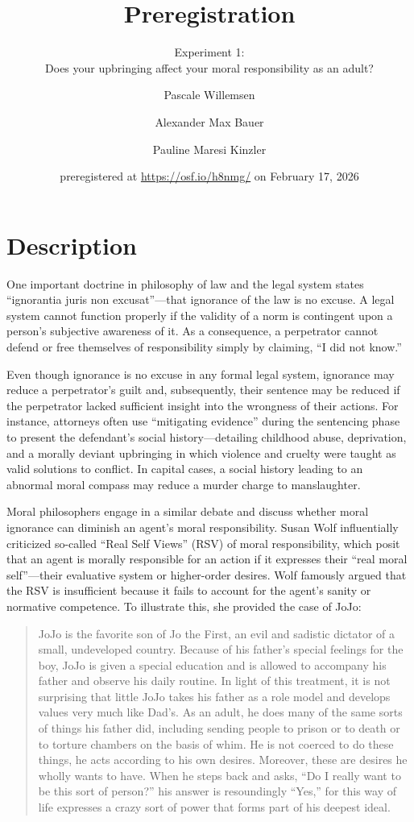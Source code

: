 \documentclass[scrarticle]{scrartcl}
\title{Preregistration}
\subtitle{Experiment 1:\\Does your upbringing affect your moral responsibility as an adult?}
\author[1]{Pascale Willemsen}
\author[2]{Alexander Max Bauer}
\author[1]{Pauline Maresi Kinzler }
\affil[1]{ University of Zurich}
\affil[2]{ Carl von Ossietzky University of Oldenburg}
\date{\small preregistered at \url{https://osf.io/h8nmg/} on February 17, 2026}
\begin{document}
\maketitle


\clearpage
\section{Description}
One important doctrine in philosophy of law and the legal system states \enquote{ignorantia juris non excusat}---that ignorance of the law is no excuse.
A legal system cannot function properly if the validity of a norm is contingent upon a person's subjective awareness of it.
As a consequence, a perpetrator cannot defend or free themselves of responsibility simply by claiming, \enquote{I did not know.}

Even though ignorance is no excuse in any formal legal system, ignorance may reduce a perpetrator's guilt and, subsequently, their sentence may be reduced if the perpetrator lacked sufficient insight into the wrongness of their actions.
For instance, attorneys often use \enquote{mitigating evidence} during the sentencing phase to present the defendant's social history---detailing childhood abuse, deprivation, and a morally deviant upbringing in which violence and cruelty were taught as valid solutions to conflict.
In capital cases, a social history leading to an abnormal moral compass may reduce a murder charge to manslaughter.

Moral philosophers engage in a similar debate and discuss whether moral ignorance can diminish an agent's moral responsibility.
Susan Wolf influentially criticized so-called \enquote{Real Self Views} (RSV) of moral responsibility, which posit that an agent is morally responsible for an action if it expresses their \enquote{real moral self}---their evaluative system or higher-order desires.
Wolf famously argued that the RSV is insufficient because it fails to account for the agent's sanity or normative competence.
To illustrate this, she provided the case of JoJo:

\begin{quote}
   JoJo is the favorite son of Jo the First, an evil and sadistic dictator of a small, undeveloped country.
   Because of his father's special feelings for the boy, JoJo is given a special education and is allowed to accompany his father and observe his daily routine.
   In light of this treatment, it is not surprising that little JoJo takes his father as a role model and develops values very much like Dad's.
   As an adult, he does many of the same sorts of things his father did, including sending people to prison or to death or to torture chambers on the basis of whim.
   He is not coerced to do these things, he acts according to his own desires.
   Moreover, these are desires he wholly wants to have.
   When he steps back and asks, \enquote{Do I really want to be this sort of person?} his answer is resoundingly \enquote{Yes,} for this way of life expresses a crazy sort of power that forms part of his deepest ideal.
\end{quote}
\end{document}
